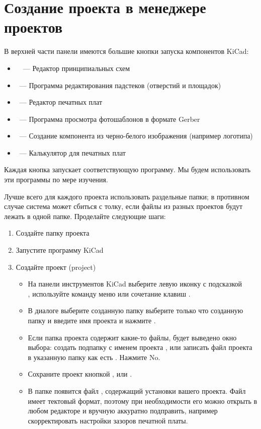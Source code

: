 \section{Создание проекта в менеджере проектов }

В верхней части панели  
имеются большие кнопки запуска компонентов KiCad:

\begin{itemize}
\item \icoesch\ \ --- Редактор принципиальных схем
\item {}\ --- Программа редактирования падстеков (отверстий и
площадок)
\item {}\ --- Редактор печатных плат
\item {}\ --- Программа просмотра фотошаблонов в формате Gerber
\item {}\ --- Создание компонента из черно-белого
изображения (например логотипа)
\item {}\ --- Калькулятор для печатных плат
\end{itemize}

Каждая кнопка запускает соответствующую программу. Мы будем использовать эти
программы по мере изучения.

\bigskip
Лучше всего для каждого проекта использовать раздельные папки; в противном
случае система может сбиться с толку, если файлы из разных проектов будут лежать
в одной папке. Проделайте следующие шаги:

\begin{enumerate}
  \item Создайте папку проекта 
  \item Запустите программу KiCad
  \item Создайте проект (project)
  \begin{itemize}
    \item 
На панели инструментов KiCad выберите левую иконку с подсказкой\\
, используйте команду меню
 или сочетание клавиш .
    \item 
В диалоге  выберите созданную папку
выберите только что созданную папку  и
введите имя проекта  и нажмите .
	\item
Если папка проекта содержит какие-то файлы, будет выведено окно выбора:
создать подпапку с именем проекта , или записать файл проекта
в указанную папку как есть . Нажмите No.
    \item 
Сохраните проект кнопкой , 
или .
	\item
В папке появится файл , содержащий установки вашего 
проекта. Файл имеет тектовый формат, поэтому при необходимости его можно открыть
в любом редакторе и вручную аккуратно подправить, например скорректировать
настройки зазоров печатной платы.
  \end{itemize}
\end{enumerate}


